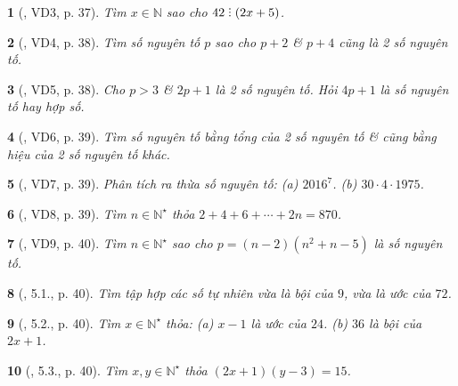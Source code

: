 \documentclass{article}
\newtheorem{baitoan}{}
\DeclareRobustCommand{\divby}{%
	\mathrel{\vbox{\baselineskip.65ex\lineskiplimit0pt\hbox{.}\hbox{.}\hbox{.}}}%
}
\begin{document}
\begin{baitoan}[\cite{Binh_boi_duong_Toan_6_tap_1}, VD3, p. 37]
	Tìm $x\in\mathbb{N}$ sao cho $42\divby(2x + 5)$.
\end{baitoan}

\begin{baitoan}[\cite{Binh_boi_duong_Toan_6_tap_1}, VD4, p. 38]
	Tìm số nguyên tố $p$ sao cho $p + 2$ \& $p + 4$ cũng là 2 số nguyên tố.
\end{baitoan}

\begin{baitoan}[\cite{Binh_boi_duong_Toan_6_tap_1}, VD5, p. 38]
	Cho $p > 3$ \& $2p + 1$ là 2 số nguyên tố. Hỏi $4p + 1$ là số nguyên tố hay hợp số.
\end{baitoan}

\begin{baitoan}[\cite{Binh_boi_duong_Toan_6_tap_1}, VD6, p. 39]
	Tìm số nguyên tố bằng tổng của 2 số nguyên tố \& cũng bằng hiệu của 2 số nguyên tố khác.
\end{baitoan}

\begin{baitoan}[\cite{Binh_boi_duong_Toan_6_tap_1}, VD7, p. 39]
	Phân tích ra thừa số nguyên tố: (a) $2016^7$. (b) $30\cdot4\cdot1975$.
\end{baitoan}

\begin{baitoan}[\cite{Binh_boi_duong_Toan_6_tap_1}, VD8, p. 39]
	Tìm $n\in\mathbb{N}^\star$ thỏa $2 + 4 + 6 + \cdots + 2n = 870$.
\end{baitoan}

\begin{baitoan}[\cite{Binh_boi_duong_Toan_6_tap_1}, VD9, p. 40]
	Tìm $n\in\mathbb{N}^\star$ sao cho $p = (n - 2)(n^2 + n - 5)$ là số nguyên tố.
\end{baitoan}

\begin{baitoan}[\cite{Binh_boi_duong_Toan_6_tap_1}, 5.1., p. 40]
	Tìm tập hợp các số tự nhiên vừa là bội của $9$, vừa là ước của $72$.
\end{baitoan}

\begin{baitoan}[\cite{Binh_boi_duong_Toan_6_tap_1}, 5.2., p. 40]
	Tìm $x\in\mathbb{N}^\star$ thỏa: (a) $x - 1$ là ước của $24$. (b) $36$ là bội của $2x + 1$.
\end{baitoan}

\begin{baitoan}[\cite{Binh_boi_duong_Toan_6_tap_1}, 5.3., p. 40]
	Tìm $x,y\in\mathbb{N}^\star$ thỏa $(2x + 1)(y - 3) = 15$.
\end{baitoan}
\end{document}
